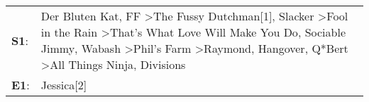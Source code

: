 \begin{supertabular}{p{0.03\textwidth}p{0.92\textwidth}}
 \textbf{S1}:  &  Der Bluten Kat\textsuperscript{}, \enspace FF\textsuperscript{} \textgreater \enspace The Fussy Dutchman[1]\textsuperscript{}, \enspace Slacker\textsuperscript{} \textgreater \enspace Fool in the Rain\textsuperscript{} \textgreater \enspace That's What Love Will Make You Do\textsuperscript{}, \enspace Sociable Jimmy\textsuperscript{}, \enspace Wabash\textsuperscript{} \textgreater \enspace Phil's Farm\textsuperscript{} \textgreater \enspace Raymond\textsuperscript{}, \enspace Hangover\textsuperscript{}, \enspace Q*Bert\textsuperscript{} \textgreater \enspace All Things Ninja\textsuperscript{}, \enspace Divisions\textsuperscript{}  \enspace  \\
 \textbf{E1}:  &                                                                                                                                                                                                                                                                                                                                                                                                                                                                                                                                                                                                                                   Jessica[2]\textsuperscript{}  \enspace  \\
\end{supertabular}
